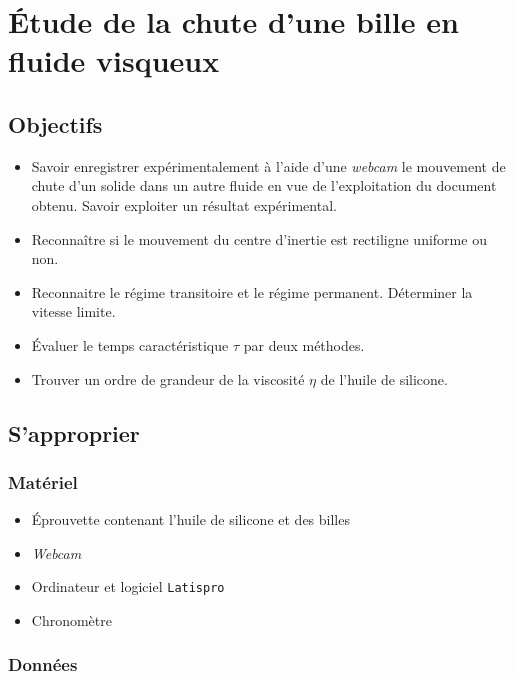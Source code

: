 \documentclass[a4paper, 11pt, final, garamond]{book}
\begin{document}
\setcounter{chapter}{17}

\chapter{\'Etude de la chute d'une bille en fluide visqueux}

\section{Objectifs}

\begin{itemize}
    \item Savoir enregistrer expérimentalement à l'aide d'une \textit{webcam} le
        mouvement de chute d'un solide dans un autre fluide en vue de
        l'exploitation du document obtenu. Savoir exploiter un résultat
        expérimental.
    \item Reconnaître si le mouvement du centre d'inertie est rectiligne
        uniforme ou non.
    \item Reconnaitre le régime transitoire et le régime permanent.  Déterminer
        la vitesse limite.
    \item Évaluer le temps caractéristique $\tau$ par deux méthodes.
    \item Trouver un ordre de grandeur de la viscosité $\eta$ de l'huile de
        silicone. 
\end{itemize}

\section{S'approprier}

\subsection{Matériel}

\begin{itemize}
    \item Éprouvette contenant l'huile de silicone et des billes
    \item \textit{Webcam}
    \item Ordinateur et logiciel \texttt{Latispro}
    \item Chronomètre
\end{itemize}
   
\subsection{Données}
\end{document}
